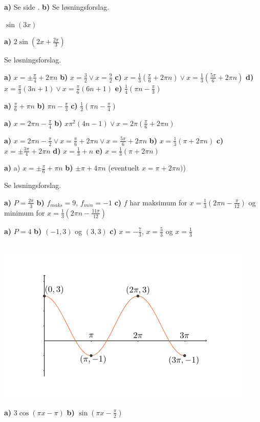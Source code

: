  \sel

 \textbf{a)} Se side \pageref{sin2xbevis}. \textbf{b)} Se løsningsforslag.

 $ \sin(3x) $

 \textbf{a)} $2\sin\left(2x+\frac{2\pi}{3}\right)  $ 

 Se løsningsforslag.

 \textbf{a)} $ x = \pm \frac{\pi}{4}+2\pi n $ \textbf{b)} $ x=\frac{3}{2} \vee x = \frac{9}{2} $ \textbf{c)} $ x=\frac{1}{3}(\frac{\pi}{6}+2\pi n)\vee x= \frac{1}{3}(\frac{5\pi}{6}+2\pi n) $ \textbf{d)} $ x=\frac{\pi}{3}(3n+1)\vee x= \frac{\pi}{6}(6 n+1)$ \textbf{e)} $\frac{1}{4}(\pi n-\frac{\pi}{3} )$

 \textbf{a)} $ \frac{\pi}{6}+\pi n $ \textbf{b)} $ \pi n-\frac{\pi}{3} $ \textbf{c)} $ \frac{1}{2}\left(\pi n-\frac{\pi}{4}\right) $

\textbf{a)} $ x=2\pi n-\frac{\pi}{4} $
\textbf{b)} $ x\pi^2(4n-1)\vee x=2\pi\left(\frac{\pi}{6}+2\pi n\right) $ 

\textbf{a)} ${ x= 2\pi n-\frac{\pi}{2} \vee x = \frac{\pi}{6}+2\pi n \vee x = \frac{5\pi}{6}+2\pi n}$ \textbf{b)} ${ x=\frac{1}{3}(\pi +2\pi n) }$ \textbf{c)} ${ x = \pm \frac{3\pi}{4}+2\pi n  }$ \textbf{d)} ${ x=\frac{1}{3}+n }$ \textbf{e)} ${ x=\frac{1}{3}(\pi +2\pi n) }$

\textbf{a)} a) $ x = \pm \frac{\pi}{6}+\pi n $ \textbf{b)} $ \pm \pi + 4\pi n$ (eventuelt $ x=\pi +2\pi n) $)

 Se løsningsforslag.

 \textbf{a)} $ P = \frac{2\pi}{3} $ \textbf{b)} $ f_{maks}=9 $, $ f_{min}=-1 $ \textbf{c)} $ f $ har maksimum for $ x= \frac{1}{3}\left(2\pi n-\frac{\pi}{12}\right) $ og minimum for $ x=\frac{1}{3}(2\pi n-\frac{11\pi}{12}) $

 \textbf{a)} $ P=4 $ \textbf{b)} $ (-1, 3) $ og $ (3, 3) $ \textbf{c)}  $ x=-\frac{7}{3} $, $ x=\frac{5}{3} $ og $ x=\frac{1}{3} $

\\
\vds
\includegraphics[]{skissin}\vs

\textbf{a)} $ 3\cos(\pi x - \pi) $ \textbf{b)} $ \sin\left(\pi x-\frac{\pi}{2}\right) $




